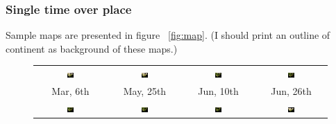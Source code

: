 \documentclass[10pt,journal,compsoc]{IEEEtran}
\begin{document}
\subsubsection{Single time over place}

Sample maps are presented in figure ~\ref{fig:map}. (I should print an outline of continent as background of these maps.)

\begin{figure}
\begin{center}
\begin{tabular}{cccc}
\includegraphics[width=0.10\textwidth]{map/72.png} &
\includegraphics[width=0.10\textwidth]{map/77.png} &
\includegraphics[width=0.10\textwidth]{map/78.png} &
\includegraphics[width=0.10\textwidth]{map/79.png}  \\
Mar, 6th&May, 25th&Jun, 10th&Jun, 26th\\
\includegraphics[width=0.10\textwidth]{map/82.png} &
\includegraphics[width=0.10\textwidth]{map/83.png} &
\includegraphics[width=0.10\textwidth]{map/84.png} &
\includegraphics[width=0.10\textwidth]{map/91.png}  \\

\end{tabular}
\end{center}
\end{figure}
\end{document}

